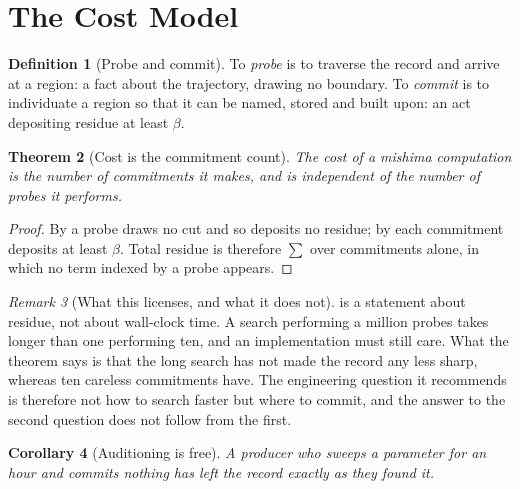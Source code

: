 \documentclass[11pt,twocolumn,a4paper]{article}
\newtheorem{theorem}{Theorem}[section]
\newtheorem{corollary}[theorem]{Corollary}
\theoremstyle{definition}
\newtheorem{definition}[theorem]{Definition}
\theoremstyle{remark}
\newtheorem{remark}[theorem]{Remark}
\newcommand{\flo}{\beta}
\begin{document}
\section{The Cost Model}
\label{sec:cost}

\begin{definition}[Probe and commit]
\label{def:probecommit}
To \emph{probe} is to traverse the record and arrive at a region: a fact about
the trajectory, drawing no boundary. To \emph{commit} is to individuate a region
so that it can be named, stored and built upon: an act depositing residue at
least $\flo$.
\end{definition}

\begin{theorem}[Cost is the commitment count]
\label{thm:cost}
The cost of a mishima computation is the number of commitments it makes, and is
independent of the number of probes it performs.
\end{theorem}

\begin{proof}
By  a probe draws no cut and so deposits no residue; by
 each commitment deposits at least $\flo$. Total residue is
therefore $\sum$ over commitments alone, in which no term indexed by a probe
appears.
\end{proof}

\begin{remark}[What this licenses, and what it does not]
\label{rem:cost-honest}
 is a statement about residue, not about wall-clock time. A search
performing a million probes takes longer than one performing ten, and an
implementation must still care. What the theorem says is that the long search has
not made the record any less sharp, whereas ten careless commitments have. The
engineering question it recommends is therefore not how to search faster but
where to commit, and the answer to the second question does not follow from the
first.
\end{remark}

\begin{corollary}[Auditioning is free]
\label{cor:audition}
A producer who sweeps a parameter for an hour and commits nothing has left the
record exactly as they found it.
\end{corollary}

\end{document}
